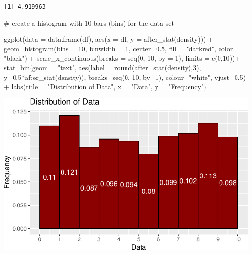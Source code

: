 \documentclass[
  letterpaper,
  DIV=11,
  numbers=noendperiod]{scrreprt}
\newenvironment{Shaded}{\begin{snugshade}}{\end{snugshade}}
\newcommand{\AttributeTok}[1]{\textcolor[rgb]{0.40,0.45,0.13}{#1}}
\newcommand{\CommentTok}[1]{\textcolor[rgb]{0.37,0.37,0.37}{#1}}
\newcommand{\DecValTok}[1]{\textcolor[rgb]{0.68,0.00,0.00}{#1}}
\newcommand{\FloatTok}[1]{\textcolor[rgb]{0.68,0.00,0.00}{#1}}
\newcommand{\FunctionTok}[1]{\textcolor[rgb]{0.28,0.35,0.67}{#1}}
\newcommand{\NormalTok}[1]{\textcolor[rgb]{0.00,0.23,0.31}{#1}}
\newcommand{\SpecialCharTok}[1]{\textcolor[rgb]{0.37,0.37,0.37}{#1}}
\newcommand{\StringTok}[1]{\textcolor[rgb]{0.13,0.47,0.30}{#1}}
\begin{document}
\begin{verbatim}
[1] 4.919963
\end{verbatim}

\begin{Shaded}
\begin{Highlighting}[]
\CommentTok{\# create a histogram with 10 bars (bins) for the data set}

\FunctionTok{ggplot}\NormalTok{(}\AttributeTok{data =} \FunctionTok{data.frame}\NormalTok{(df), }\FunctionTok{aes}\NormalTok{(}\AttributeTok{x =}\NormalTok{ df, }\AttributeTok{y =} \FunctionTok{after\_stat}\NormalTok{(density))) }\SpecialCharTok{+}
  \FunctionTok{geom\_histogram}\NormalTok{(}\AttributeTok{bins =} \DecValTok{10}\NormalTok{, }\AttributeTok{binwidth =} \DecValTok{1}\NormalTok{, }\AttributeTok{center=}\FloatTok{0.5}\NormalTok{, }\AttributeTok{fill =} \StringTok{"darkred"}\NormalTok{, }\AttributeTok{color =} \StringTok{"black"}\NormalTok{) }\SpecialCharTok{+}
  \FunctionTok{scale\_x\_continuous}\NormalTok{(}\AttributeTok{breaks =} \FunctionTok{seq}\NormalTok{(}\DecValTok{0}\NormalTok{, }\DecValTok{10}\NormalTok{, }\AttributeTok{by =} \DecValTok{1}\NormalTok{), }\AttributeTok{limits =} \FunctionTok{c}\NormalTok{(}\DecValTok{0}\NormalTok{,}\DecValTok{10}\NormalTok{))}\SpecialCharTok{+}
    \FunctionTok{stat\_bin}\NormalTok{(}\AttributeTok{geom =} \StringTok{"text"}\NormalTok{, }\FunctionTok{aes}\NormalTok{(}\AttributeTok{label =} \FunctionTok{round}\NormalTok{(}\FunctionTok{after\_stat}\NormalTok{(density),}\DecValTok{3}\NormalTok{), }\AttributeTok{y=}\FloatTok{0.5}\SpecialCharTok{*}\FunctionTok{after\_stat}\NormalTok{(density)), }
           \AttributeTok{breaks=}\FunctionTok{seq}\NormalTok{(}\DecValTok{0}\NormalTok{, }\DecValTok{10}\NormalTok{, }\AttributeTok{by=}\DecValTok{1}\NormalTok{), }\AttributeTok{colour=}\StringTok{"white"}\NormalTok{, }\AttributeTok{vjust=}\FloatTok{0.5}\NormalTok{) }\SpecialCharTok{+}
  \FunctionTok{labs}\NormalTok{(}\AttributeTok{title =} \StringTok{"Distribution of Data"}\NormalTok{, }\AttributeTok{x =} \StringTok{"Data"}\NormalTok{, }\AttributeTok{y =} \StringTok{"Frequency"}\NormalTok{)}
\end{Highlighting}
\end{Shaded}

\includegraphics{Qualitative_and_Quantitative_Variables_files/figure-pdf/unnamed-chunk-4-1.pdf}
\end{document}
